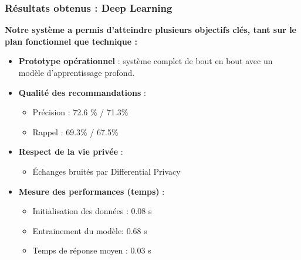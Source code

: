 \documentclass{beamer}
\begin{document}
    \begin{frame}
        \frametitle{Résultats obtenus : Deep Learning}
        \scriptsize
        \textbf{Notre système a permis d’atteindre plusieurs objectifs clés, tant sur le plan fonctionnel que technique :}

        \vspace{0.3cm}
        \begin{itemize}
            \item \textbf{Prototype opérationnel} : système complet de bout en bout avec un modèle d’apprentissage profond.
            \item \textbf{Qualité des recommandations} :
            \begin{itemize}
                \item Précision : 72.6 \% / 71.3\%
                \item Rappel : 69.3\% / 67.5\%
            \end{itemize}
            \item \textbf{Respect de la vie privée} :
            \begin{itemize}
                \item Échanges bruités par Differential Privacy
            \end{itemize}
            \item \textbf{Mesure des performances (temps)} :
            \begin{itemize}
                \item Initialisation des données : 0.08 s
                \item Entrainement du modèle: 0.68 s
                \item Temps de réponse moyen : 0.03 s
            \end{itemize}
        \end{itemize}      
    \end{frame}
\end{document}
